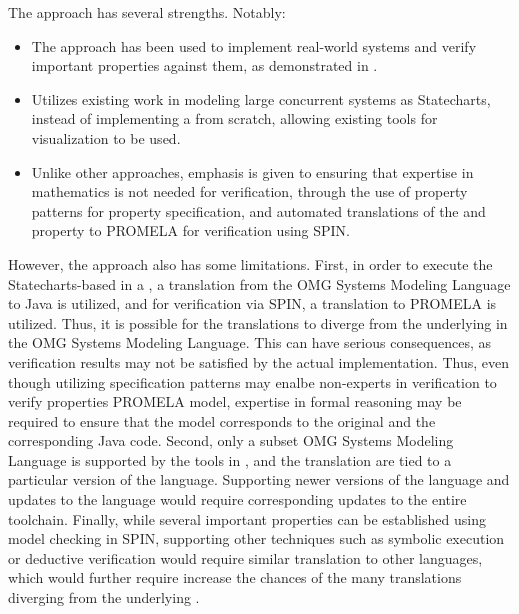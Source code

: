 The \MDA{} approach has several strengths. Notably:
\begin{itemize}
  \item The approach has been used to implement real-world
    systems and verify important properties against them,
    as demonstrated in \cite{PorresECBS08}.
  \item Utilizes existing work in modeling large concurrent
    systems as Statecharts, instead of implementing a \DSL{} from
    scratch, allowing existing tools for visualization to be used.
  \item Unlike other approaches, emphasis is given to ensuring
    that expertise in mathematics is not needed for verification,
    through the use of property patterns for property specification,
    and automated translations of the \BPG{} and property to PROMELA
    for verification using SPIN.
\end{itemize}

However, the approach also has some limitations. First, in order to execute the
Statecharts-based \BPG{} in a \CDSS{}, a translation from the OMG Systems
Modeling Language \cite{OMGSpecUrl} to Java is utilized, and for
verification via SPIN, a translation to PROMELA is utilized. Thus, it
is possible for the translations to diverge from the underlying \BPG{}
in the OMG Systems Modeling Language. This can have serious
consequences, as verification results may not be satisfied by the actual
implementation. Thus, even though utilizing specification patterns
may enalbe non-experts in verification to verify properties PROMELA model,
expertise in formal reasoning may be required to ensure that the model
corresponds to the original \BPG{} and the corresponding Java code.
Second, only a subset OMG Systems Modeling Language is supported
by the tools in \cite{PerezJBI10,PorresECBS08}, and the translation
are tied to a particular version of the language. Supporting newer
versions of the language and updates to the language would require
corresponding updates to the entire toolchain. Finally, while several
important properties can be established using model checking in SPIN,
supporting other techniques such as symbolic execution or deductive
verification would require similar translation to other languages, which
would further require increase the chances of the many translations
diverging from the underlying \BPG{}.


